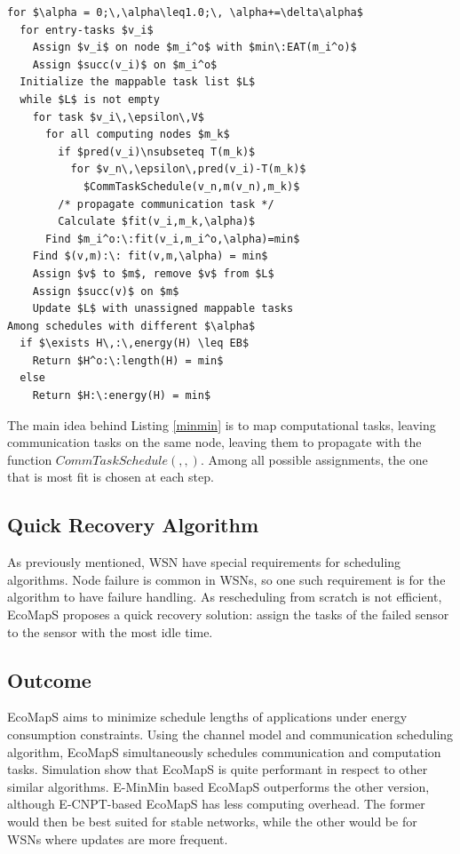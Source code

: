 \lstset{numbers=left, mathescape=true, title='SingleMinMin Algorithm', nolol=false,caption=Single MinMin Algorithm,label=minmin}
\begin{lstlisting}
for $\alpha = 0;\,\alpha\leq1.0;\, \alpha+=\delta\alpha$
  for entry-tasks $v_i$
    Assign $v_i$ on node $m_i^o$ with $min\:EAT(m_i^o)$
    Assign $succ(v_i)$ on $m_i^o$
  Initialize the mappable task list $L$
  while $L$ is not empty
    for task $v_i\,\epsilon\,V$
      for all computing nodes $m_k$
        if $pred(v_i)\nsubseteq T(m_k)$
          for $v_n\,\epsilon\,pred(v_i)-T(m_k)$
            $CommTaskSchedule(v_n,m(v_n),m_k)$ 
	    /* propagate communication task */
        Calculate $fit(v_i,m_k,\alpha)$
      Find $m_i^o:\:fit(v_i,m_i^o,\alpha)=min$
    Find $(v,m):\: fit(v,m,\alpha) = min$
    Assign $v$ to $m$, remove $v$ from $L$
    Assign $succ(v)$ on $m$
    Update $L$ with unassigned mappable tasks
Among schedules with different $\alpha$
  if $\exists H\,:\,energy(H) \leq EB$
    Return $H^o:\:length(H) = min$
  else 
    Return $H:\:energy(H) = min$
\end{lstlisting}


The main idea behind Listing \ref{minmin} is to map computational tasks, leaving communication tasks on the same node, leaving them to propagate with the
function $CommTaskSchedule( , , )$. Among all possible assignments, the one that is most fit is chosen at each step.

\subsection{Quick Recovery Algorithm}

As previously mentioned, WSN have special requirements for scheduling algorithms. Node failure is common in WSNs, so one such requirement is for the algorithm 
to have failure handling. As rescheduling from scratch is not efficient, EcoMapS proposes a quick recovery solution: assign the tasks of the failed sensor to the 
sensor with the most idle time.

\subsection{Outcome}

EcoMapS aims to minimize schedule lengths of applications under energy consumption constraints. Using the channel model and communication scheduling
algorithm, EcoMapS simultaneously schedules communication and computation tasks. Simulation show that EcoMapS is quite performant in respect to other similar 
algorithms. E-MinMin based EcoMapS outperforms the other version, although E-CNPT-based EcoMapS has less computing overhead. The former would then be best 
suited for stable networks, while the other would be for WSNs where updates are more frequent.

